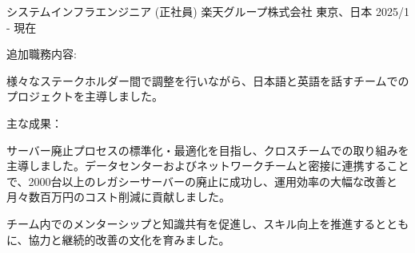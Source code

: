 

\begin{cventries}
  \cventry
    {システムインフラエンジニア (正社員)} %
    {楽天グループ株式会社} %
    {東京、日本} %
    {2025/1 - 現在} %
    {
      追加職務内容:
      \begin{cvbullets}
        \item 様々なステークホルダー間で調整を行いながら、日本語と英語を話すチームでのプロジェクトを主導しました。
      \end{cvbullets}
      主な成果：
      \begin{cvbullets}
        \item サーバー廃止プロセスの標準化・最適化を目指し、クロスチームでの取り組みを主導しました。データセンターおよびネットワークチームと密接に連携することで、2000台以上のレガシーサーバーの廃止に成功し、運用効率の大幅な改善と月々数百万円のコスト削減に貢献しました。
        \item チーム内でのメンターシップと知識共有を促進し、スキル向上を推進するとともに、協力と継続的改善の文化を育みました。
      \end{cvbullets}
    }


\end{cventries}
